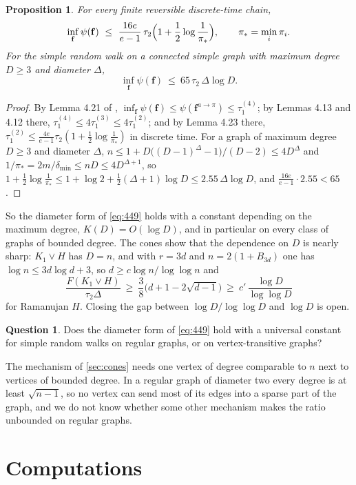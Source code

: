 \documentclass[11pt]{amsart}
\newtheorem{proposition}[theorem]{Proposition}
\theoremstyle{definition}
\newtheorem{question}[theorem]{Question}
\newcommand{\bfF}{\mathbf{f}}
\begin{document}
\begin{proposition}\label{prop:degree}
For every finite reversible discrete-time chain,
\[
\inf_{\bfF}\psi(\bfF)\ \le\ \frac{16e}{e-1}\,\tau_2\Bigl(1+\frac12\log\frac1{\pi_*}\Bigr),\qquad \pi_*=\min_i\pi_i .
\]
For the simple random walk on a connected simple graph with maximum degree $D\ge3$ and diameter $\Delta$,
\[
\inf_{\bfF}\psi(\bfF)\ \le\ 65\,\tau_2\,\Delta\log D .
\]
\end{proposition}

\begin{proof}
By Lemma 4.21 of \cite{AF}, $\inf_{\bfF}\psi(\bfF)\le\psi(\bfF^{a\to\pi})\le\tau_1^{(4)}$; by Lemmas 4.13 and 4.12 there, $\tau_1^{(4)}\le4\tau_1^{(3)}\le4\tau_1^{(2)}$; and by Lemma 4.23 there, $\tau_1^{(2)}\le\frac{4e}{e-1}\tau_2(1+\frac12\log\frac1{\pi_*})$ in discrete time. For a graph of maximum degree $D\ge3$ and diameter $\Delta$, $n\le1+D\bigl((D-1)^\Delta-1\bigr)/(D-2)\le4D^\Delta$ and $1/\pi_*=2m/\delta_{\min}\le nD\le4D^{\Delta+1}$, so $1+\frac12\log\frac1{\pi_*}\le1+\log2+\frac12(\Delta+1)\log D\le2.55\,\Delta\log D$, and $\frac{16e}{e-1}\cdot2.55<65$.
\end{proof}

So the diameter form of \eqref{eq:449} holds with a constant depending on the maximum degree, $K(D)=O(\log D)$, and in particular on every class of graphs of bounded degree. The cones show that the dependence on $D$ is nearly sharp: $K_1\vee H$ has $D=n$, and with $r=3d$ and $n=2(1+B_{3d})$ one has $\log n\le3d\log d+3$, so $d\ge c\log n/\log\log n$ and
\[
\frac{F(K_1\vee H)}{\tau_2\Delta}\ \ge\ \frac38\bigl(d+1-2\sqrt{d-1}\bigr)\ \ge\ c'\,\frac{\log D}{\log\log D}
\]
for Ramanujan $H$. Closing the gap between $\log D/\log\log D$ and $\log D$ is open.

\begin{question}
Does the diameter form of \eqref{eq:449} hold with a universal constant for simple random walks on regular graphs, or on vertex-transitive graphs?
\end{question}

The mechanism of \cref{sec:cones} needs one vertex of degree comparable to $n$ next to vertices of bounded degree. In a regular graph of diameter two every degree is at least $\sqrt{n-1}$, so no vertex can send most of its edges into a sparse part of the graph, and we do not know whether some other mechanism makes the ratio unbounded on regular graphs.

\section{Computations}\label{sec:comp}
\end{document}
